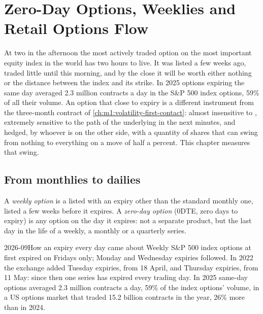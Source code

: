 \chapter{Zero-Day Options, Weeklies and Retail Options Flow}\label{ch:m1:zero-day-options-and-retail-flow}

At two in the afternoon the most actively traded option on the most
important equity index in the world has two hours to live. It was listed a
few weeks ago, traded little until this morning, and by the close it will be
worth either nothing or the distance between the index and its strike. In
2025 options expiring the same day averaged 2.3 million contracts a day in
the S\&P 500 index options, 59\% of all their volume. An option that close to
expiry is a different instrument from the three-month contract of
\cref{ch:m1:volatility-first-contact}: almost insensitive to , extremely sensitive to the path of the underlying in the next
minutes, and hedged, by whoever is on the other side, with a quantity of
shares that can swing from nothing to everything on a move of half a
percent. This chapter measures that swing.

\section{From monthlies to dailies}

\begin{definition}\label{def:m1:zero-day-options-and-retail-flow:zero}
A \emph{weekly option} is a listed  with an
expiry other than the standard monthly one, listed a few weeks before it
expires. A \emph{zero-day option} (0DTE, zero days to
expiry) is any option on the day it expires: not a separate product, but the
last day in the life of a weekly, a monthly or a quarterly series.
\end{definition}

\begin{dated}{2026-09}{How an expiry every day came about}\label{dat:m1:zero-day-options-and-retail-flow:dailies}
Weekly S\&P 500 index options at first expired on Fridays only; Monday and
Wednesday expiries followed. In 2022 the exchange added Tuesday expiries, from 18 April, and
Thursday expiries, from 11 May: since then one series has expired every
trading day. In 2025 same-day options averaged 2.3 million contracts a day,
59\% of the index options' volume, in a US options market that traded 15.2
billion contracts in the year, 26\% more than in 2024.
\end{dated}

